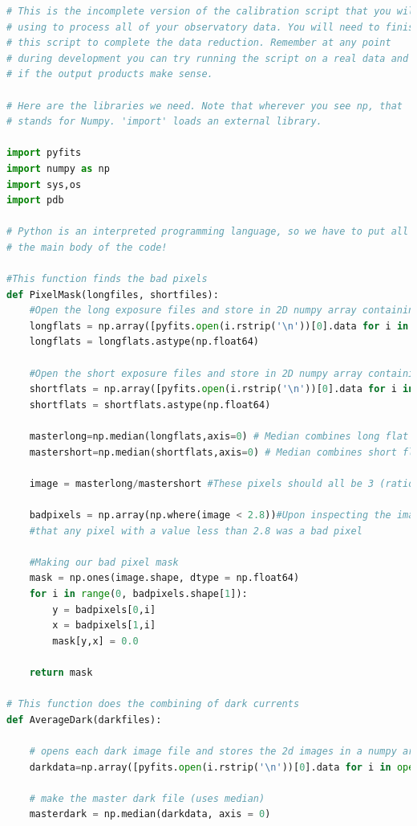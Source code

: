 \documentclass{aastex61}
\begin{document}
\begin{lstlisting}[language=Python, caption= Cleans science images (YM)]
# This is the incomplete version of the calibration script that you will be
# using to process all of your observatory data. You will need to finish 
# this script to complete the data reduction. Remember at any point
# during development you can try running the script on a real data and see
# if the output products make sense.

# Here are the libraries we need. Note that wherever you see np, that
# stands for Numpy. 'import' loads an external library.

import pyfits
import numpy as np
import sys,os
import pdb

# Python is an interpreted programming language, so we have to put all of our functions BEFORE
# the main body of the code!

#This function finds the bad pixels
def PixelMask(longfiles, shortfiles):
	#Open the long exposure files and store in 2D numpy array containing doubles
	longflats = np.array([pyfits.open(i.rstrip('\n'))[0].data for i in open(longfiles)])
	longflats = longflats.astype(np.float64)

	#Open the short exposure files and store in 2D numpy array containing doubles
	shortflats = np.array([pyfits.open(i.rstrip('\n'))[0].data for i in open(shortfiles)])
	shortflats = shortflats.astype(np.float64)

	masterlong=np.median(longflats,axis=0) # Median combines long flat images
	mastershort=np.median(shortflats,axis=0) # Median combines short flat images

	image = masterlong/mastershort #These pixels should all be 3 (ratio of our exposure times)

	badpixels = np.array(np.where(image < 2.8))#Upon inspecting the image with ds9, we determined 
	#that any pixel with a value less than 2.8 was a bad pixel

	#Making our bad pixel mask
	mask = np.ones(image.shape, dtype = np.float64)
	for i in range(0, badpixels.shape[1]):
		y = badpixels[0,i]
		x = badpixels[1,i]
		mask[y,x] = 0.0

	return mask

# This function does the combining of dark currents
def AverageDark(darkfiles):
	
	# opens each dark image file and stores the 2d images in a numpy array
	darkdata=np.array([pyfits.open(i.rstrip('\n'))[0].data for i in open(darkfiles)])
	
	# make the master dark file (uses median)
	masterdark = np.median(darkdata, axis = 0)
	

\end{lstlisting}
\end{document}
